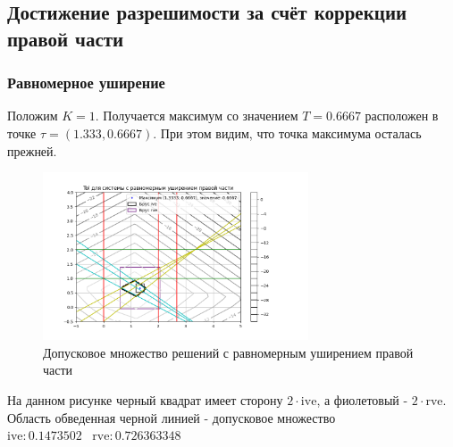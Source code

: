 \documentclass[a4paper,14pt]{article}
\begin{document}
	\subsection{Достижение разрешимости за счёт коррекции правой части}
	\subsubsection{Равномерное уширение}
	Положим $K=1$. Получается максимум со значением $T=0.6667$ расположен в точке $\tau=(1.333,0.6667)$. При этом видим, что точка максимума осталась прежней.
	\begin{figure}[H] \label{MatrixCorrSet}
		\centering
		\includegraphics[width=0.7\textwidth]{../src/pic/even_right.png}
		\caption{Допусковое множество решений с равномерным уширением правой части} 
	\end{figure}
	\noindent На данном рисунке черный квадрат имеет сторону $2\cdot \mathrm{ive}$, а фиолетовый - $2\cdot \mathrm{rve}$. Область обведенная черной линией - допусковое множество\\
	$\mathrm{ive}: 0.1473502 \;\;\;\mathrm{rve}: 0.726363348$
	
\end{document}
